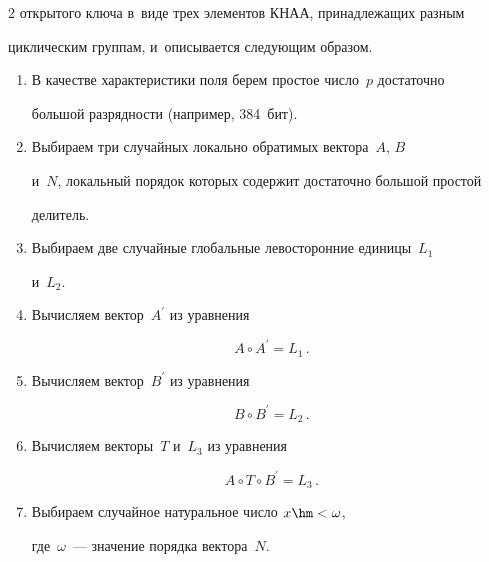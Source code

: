 \begin{multicols}{2}
открытого ключа в~виде трех элементов КНАА, принадлежащих разным 


циклическим группам, и~описывается следующим образом. 


  \begin{enumerate}[1.]


  \item В качестве характеристики поля берем простое число~$p$ достаточно 


большой разрядности (например, 384~бит). 


  \item Выбираем три случайных локально обратимых вектора~$A$, $B$ 


и~$N$, локальный порядок которых содержит достаточно большой простой 


делитель.


  \item  Выбираем две случайные глобальные левосторонние единицы~$L_1$ 


и~$L_2$.


  \item  Вычисляем вектор~$A^\prime$ из уравнения 


  \begin{equation}


  A\circ A^\prime =L_1\,.


  \label{e20-f}


  \end{equation}


  \item Вычисляем вектор~$B^\prime$ из уравнения 


  \begin{equation}


  B\circ B^\prime =L_2\,.


  \label{e21-f}


  \end{equation}


  \item Вычисляем векторы~$T$ и~$L_3$ из уравнения 


  \begin{equation}


  A\circ T\circ B^\prime =L_3\,.


  \label{e22-f}


  \end{equation}


  \item Выбираем случайное натуральное число $x\hm<\omega$, 


где~$\omega$~--- значение порядка вектора~$N$.



\end{enumerate}
\end{multicols}
